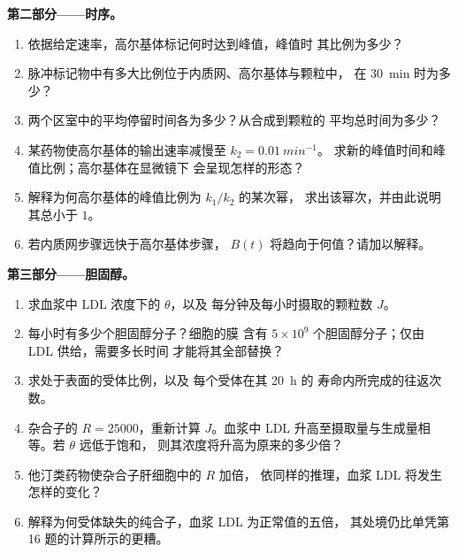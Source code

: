\begin{problem}
\medskip
\noindent\textbf{第二部分——时序。}
\begin{enumerate}[resume]
  \item 依据给定速率，高尔基体标记何时达到峰值，峰值时
        其比例为多少？
  \item 脉冲标记物中有多大比例位于内质网、高尔基体与颗粒中，
        在 \qty{30}{min} 时为多少？
  \item 两个区室中的平均停留时间各为多少？从合成到颗粒的
        平均总时间为多少？
  \item 某药物使高尔基体的输出速率减慢至 $k_{2} = \qty{0.01}{min^{-1}}$。
        求新的峰值时间和峰值比例；高尔基体在显微镜下
        会呈现怎样的形态？
  \item 解释为何高尔基体的峰值比例为 $k_{1}/k_{2}$ 的某次幂，
        求出该幂次，并由此说明其总小于 $1$。
  \item 若内质网步骤远快于高尔基体步骤，
        $B(t)$ 将趋向于何值？请加以解释。
\end{enumerate}

\medskip
\noindent\textbf{第三部分——胆固醇。}
\begin{enumerate}[resume]
  \item 求血浆中 LDL 浓度下的 $\theta$，以及
        每分钟及每小时摄取的颗粒数 $J$。
  \item 每小时有多少个胆固醇分子？细胞的膜
        含有 $5\times 10^{9}$ 个胆固醇分子；仅由 LDL 供给，需要多长时间
        才能将其全部替换？
  \item 求处于表面的受体比例，以及
        每个受体在其 \qty{20}{h} 的
        寿命内所完成的往返次数。
  \item 杂合子的 $R = \num{25000}$，重新计算 $J$。血浆中 LDL
        升高至摄取量与生成量相等。若 $\theta$ 远低于饱和，
        则其浓度将升高为原来的多少倍？
  \item 他汀类药物使杂合子肝细胞中的 $R$ 加倍，
        依同样的推理，血浆 LDL 将发生怎样的变化？
  \item 解释为何受体缺失的纯合子，血浆 LDL 为正常值的五倍，
        其处境仍比单凭第
        16 题的计算所示的更糟。
\end{enumerate}


\end{problem}
